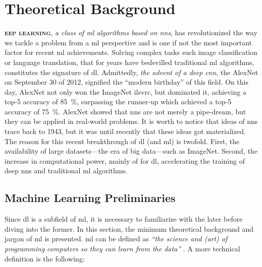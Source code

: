 \chapter{Theoretical Background}

\lettrine[
	nindent=0em, findent=0.5em, loversize=-0.12, lines=5
]{}{\bfseries\color{Blue}eep learning},
\emph{a class of \gls{ml} algorithms based on
\glspl{nn}}, has revolutionized the way we tackle a problem from a \gls{ml}
perspective and is one if not the most important factor for recent \gls{ml}
achievements. Solving complex tasks such image classification or language translation, that for
years have bedevilled traditional \gls{ml} algorithms, constitutes the signature
of \gls{dl}. Admittedly, \emph{the advent of a deep
\gls{cnn}}, the AlexNet \parencite{alexnet}
on September 30 of 2012, signified the ``modern birthday'' of this field. On
this day, AlexNet not only won the ImageNet \parencite{Deng_2009}
\gls{ilsvrc}, but dominated it, achieving a top-5 accuracy
of \SI{85}{\percent}, surpassing the runner-up which achieved a top-5 accuracy
of \SI{75}{\percent}.  AlexNet showed that \glspl{nn} are not merely a
pipe-dream, but they can be applied in real-world problems. It is worth to
notice that ideas of \glspl{nn} trace back to 1943, but it was until recently
that these ideas got materialized. The reason for this recent breakthrough of
\gls{dl} (and \gls{ml}) is twofold. First, the availability of large
datasets---the era of big data---such as
ImageNet. Second, the increase in computational power, mainly of
 for \gls{dl}, accelerating the training of deep \glspl{nn} and
traditional \gls{ml} algorithms.

\section{Machine Learning Preliminaries}

Since \gls{dl} is a subfield of \gls{ml}, it is necessary to familiarize with
the later before diving into the former. In this section, the minimum
theoretical background and jargon of \gls{ml} is presented. \Acrlong{ml} can be
defined as \emph{``the science and (art) of programming computers so they can
learn from the data''} \parencite{ml}. A more technical definition is the following:

